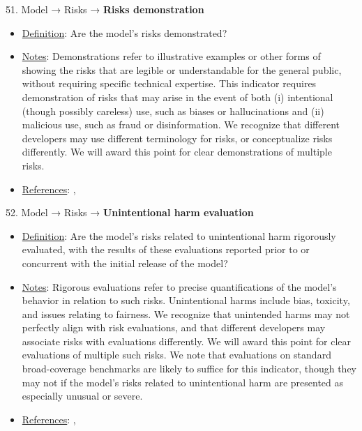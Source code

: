 51. Model → Risks → \textbf{Risks demonstration}
\vspace{-\parskip}
\begin{itemize}
	\item
	\underline{Definition}: Are the model’s risks demonstrated?
	\item
	\underline{Notes}: Demonstrations refer to illustrative examples or other forms of showing the risks that are legible or understandable for the general public, without requiring specific technical expertise. This indicator requires demonstration of risks that may arise in the event of both (i) intentional (though possibly careless) use, such as biases or hallucinations and (ii) malicious use, such as fraud or disinformation. We recognize that different developers may use different terminology for risks, or conceptualize risks differently. We will award this point for clear demonstrations of multiple risks.
	\item
	\underline{References}: \citet{solaiman2023evaluating}, \citet{weidinger2021ethical}
\end{itemize} \vspace{\baselineskip}


52. Model → Risks → \textbf{Unintentional harm evaluation}
\vspace{-\parskip}
\begin{itemize}
	\item
	\underline{Definition}: Are the model’s risks related to unintentional harm rigorously evaluated, with the results of these evaluations reported prior to or concurrent with the initial release of the model?
	\item
	\underline{Notes}: Rigorous evaluations refer to precise quantifications of the model's behavior in relation to such risks. Unintentional harms include bias, toxicity, and issues relating to fairness. We recognize that unintended harms may not perfectly align with risk evaluations, and that different developers may associate risks with evaluations differently. We will award this point for clear evaluations of multiple such risks. We note that evaluations on standard broad-coverage benchmarks are likely to suffice for this indicator, though they may not if the model's risks related to unintentional harm are presented as especially unusual or severe.
	\item
	\underline{References}: \citet{solaiman2023evaluating}, \citet{weidinger2021ethical}
\end{itemize} \vspace{\baselineskip}


